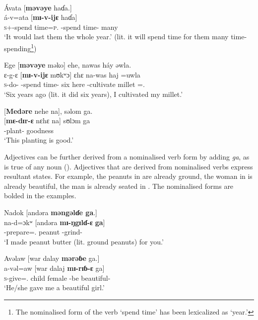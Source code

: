 \clearpage
\ea\label{ex:7:155}\\
 Ávata  [\textbf{məvəye}  haɗa.]\\
\gll  á-v=ata       [\textbf{mɪ-v-ijɛ}      haɗa]\\
      \textsc{s}+{\IFV}-{spend time}=\textsc{p}.{\IO}  {\NOM}{}-{spend time}-{\CL}  many\\
\glt  ‘It would last them the whole year.’  (lit. it will {spend time} for them many time-spending\footnote{The nominalised form of the verb ‘{spend time}’ has been lexicalized as ‘year.’})\\
\z 

\ea\label{ex:7:156}
Ege  [\textbf{məvəye} məko] ehe,  nawas  háy  əwla.\\
\gll  ɛ{}-g-ɛ  [\textbf{mɪ-v-ijɛ}  mʊkʷɔ]  ɛhɛ  na-was    haj  =uwla\\
      \textsc{s}-do-{\CL}  {\NOM}{}-{spend time}-{\CL}  six  here  {\oneS}-cultivate  millet  ={\oneS}.{\POSS}\\
\glt ‘Six years ago (lit. it did six years), I cultivated my millet.’ 
\z

\ea\label{ex:7:157}
{}[\textbf{Medəre}  nehe   na],  səlom  ga.\\
\gll  {}[\textbf{mɛ-dɪr-ɛ}    nɛhɛ  na]  sʊlɔm    ga\\
      {\NOM}{}-plant-{\CL}  {\DEM}  {\PSP}  goodness  {\ADJ}\\
\glt  ‘This planting is good.’\\
\z

Adjectives can be further derived from a nominalised verb form by adding \textit{ga}, as is true of any noun (). Adjectives that are derived from nominalised verbs express resultant states. For example, the peanuts in  are already ground, the woman in  is already beautiful, the man is already seated in . The nominalised forms are bolded in the examples. 

\ea\label{ex:7:158}
Nadok  [andəra  \textbf{məngəlɗe  ga}.]\\
\gll  na-d=ɔkʷ    [andəra \textbf{mɪ-ŋgɪlɗ-ɛ}    \textbf{ga}]\\
      {\oneS}-prepare={\twoS}.{\IO}  peanut     {\NOM}{}-grind-{\CL}    {\ADJ}\\
\glt  ‘I made peanut butter (lit. ground peanuts) for you.’\\
\z 

\ea\label{ex:7:159}
Avəlaw  [war  dalay  \textbf{mərəɓe}  ga.]\\
\gll  a-vəl=aw    [war   dalaj  \textbf{mɪ-rɪɓ-ɛ}      ga]\\
      \textsc{s}-give={\oneS}.{\IO}  child  female  {\NOM}{}-{be beautiful}-{\CL}  {\ADJ}\\
\glt  ‘He/she gave me a beautiful girl.’ \\
\z 

